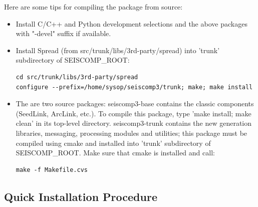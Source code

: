 \documentclass[11pt,a4paper,titlepage]{article}
\begin{document}
Here are some tips for compiling the package from source:
\begin{itemize}
\item Install C/C++ and Python development selections and the above
packages with "-devel" suffix if available.

\item Install Spread (from src/trunk/libs/3rd-party/spread) into 'trunk'
subdirectory of SEISCOMP\_ROOT:
\begin{verbatim}
cd src/trunk/libs/3rd-party/spread
configure --prefix=/home/sysop/seiscomp3/trunk; make; make install
\end{verbatim}

\item The are two source packages: seiscomp3-base contains the classic
components (SeedLink, ArcLink, etc.). To compile this package, type 'make
install; make clean' in its top-level directory. seiscomp3-trunk contains the
new generation libraries, messaging, processing modules and utilities; this
package must be compiled using cmake and installed into 'trunk' subdirectory of
SEISCOMP\_ROOT. Make sure that cmake is installed and call:
\begin{verbatim}
make -f Makefile.cvs
\end{verbatim}
\end{itemize}


\subsection{Quick Installation Procedure}
\end{document}
